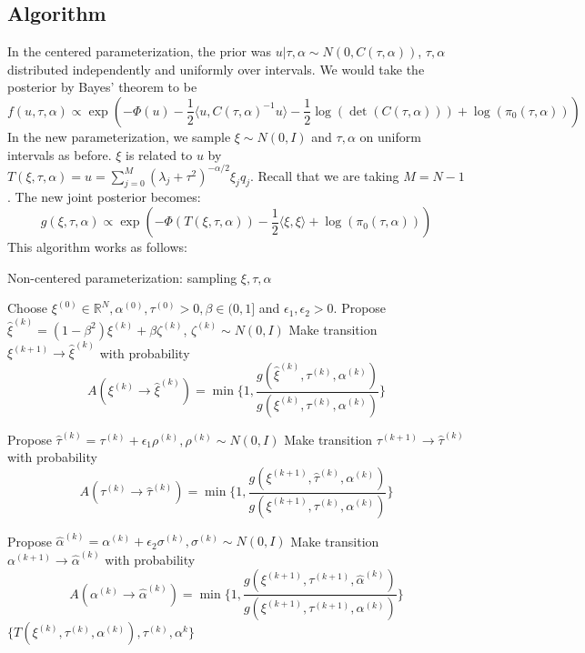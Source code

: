 \documentclass{siamart1116}
\begin{document}
\subsection{Algorithm}
In the centered parameterization, the prior was $u|\tau,\alpha \sim N(0, C(\tau, \alpha))$, $\tau, \alpha$ distributed independently and uniformly over intervals. We would take the posterior by Bayes' theorem to be
\[f(u,\tau,\alpha) \propto \exp\left(-\Phi(u) -\frac{1}{2}\langle u, C(\tau,\alpha)^{-1}u \rangle - \frac{1}{2}\log(\det(C(\tau,\alpha))) + \log(\pi_0(\tau,\alpha))\right) \]
In the new parameterization, we sample $\xi \sim N(0, I)$ and $\tau, \alpha$ on uniform intervals as before. $\xi$ is related to $u$ by $T(\xi,\tau,\alpha) = u = \sum_{j=0}^{M}(\lambda_j+\tau^2)^{-\alpha/2}\xi_jq_j$. Recall that we are taking $M=N-1$. The new joint posterior becomes:
\[ g(\xi,\tau,\alpha) \propto \exp\left( -\Phi(T(\xi,\tau,\alpha))-\frac{1}{2}\langle \xi,\xi \rangle + \log(\pi_0(\tau,\alpha)) \right)\]
This algorithm works as follows:
\begin{algorithm}
\caption{Non-centered parameterization: sampling $\xi, \tau, \alpha$}
\label{alg:xi_tau_alpha}
\begin{algorithmic}
\State Choose $\xi^{(0)} \in \mathbb{R}^N, \alpha^{(0)}, \tau^{(0)} > 0, \beta \in (0, 1]$ and $\epsilon_1, \epsilon_2 > 0$.
\State Propose $\hat\xi^{(k)} = (1-\beta^2)\xi^{(k)} + \beta \zeta^{(k)}$, $\zeta^{(k)} \sim N(0, I)$
\State Make transition $\xi^{(k+1)} \to \hat\xi^{(k)}$ with probability
\[ A(\xi^{(k)} \to \hat\xi^{(k)}) = \min\{1, \frac{g(\hat\xi^{(k)},\tau^{(k)},\alpha^{(k)})}{g(\xi^{(k)},\tau^{(k)},\alpha^{(k)})} \}\]

\State Propose $\hat\tau^{(k)} = \tau^{(k)} + \epsilon_1 \rho^{(k)}, \rho^{(k)} \sim N(0,I)$
\State Make transition $\tau^{(k+1)} \to \hat\tau^{(k)}$ with probability
\[ A(\tau^{(k)} \to \hat\tau^{(k)}) = \min\{1, \frac{g(\xi^{(k+1)},\hat\tau^{(k)},\alpha^{(k)})}{g(\xi^{(k+1)},\tau^{(k)},\alpha^{(k)})} \}\]

\State Propose $\hat\alpha^{(k)} = \alpha^{(k)} + \epsilon_2 \sigma^{(k)}, \sigma^{(k)} \sim N(0,I)$
\State Make transition $\alpha^{(k+1)} \to \hat\alpha^{(k)}$ with probability
\[ A(\alpha^{(k)} \to \hat\alpha^{(k)}) = \min\{1, \frac{g(\xi^{(k+1)},\tau^{(k+1)},\hat \alpha^{(k)})}{g(\xi^{(k+1)},\tau^{(k+1)},\alpha^{(k)})} \}\]
\EndFor
\State \Return $\{ T(\xi^{(k)},\tau^{(k)},\alpha^{(k)}), \tau^{(k)}, \alpha^{k} \}$
\end{algorithmic}
\end{algorithm}
\end{document}
